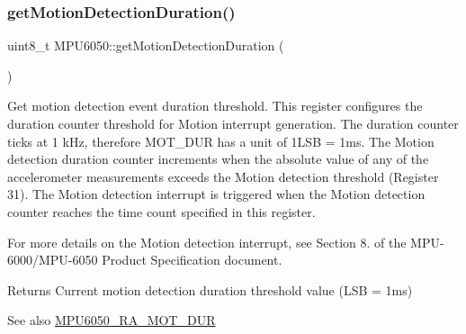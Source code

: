 \begin{DoxyCode}{0}

\end{DoxyCode}
\mbox{\label{classMPU6050_a8ba035c2ae4a05d7e51b0d29e4924fb0}} 
\subsubsection{\texorpdfstring{getMotionDetectionDuration()}{getMotionDetectionDuration()}}
{\footnotesize\ttfamily uint8\+\_\+t M\+P\+U6050\+::get\+Motion\+Detection\+Duration (\begin{DoxyParamCaption}{ }\end{DoxyParamCaption})}

Get motion detection event duration threshold. This register configures the duration counter threshold for Motion interrupt generation. The duration counter ticks at 1 k\+Hz, therefore M\+O\+T\+\_\+\+D\+UR has a unit of 1L\+SB = 1ms. The Motion detection duration counter increments when the absolute value of any of the accelerometer measurements exceeds the Motion detection threshold (Register 31). The Motion detection interrupt is triggered when the Motion detection counter reaches the time count specified in this register.

For more details on the Motion detection interrupt, see Section 8. of the M\+P\+U-\/6000/\+M\+P\+U-\/6050 Product Specification document.

\begin{DoxyReturn}{Returns}
Current motion detection duration threshold value (L\+SB = 1ms) 
\end{DoxyReturn}
\begin{DoxySeeAlso}{See also}
\mbox{\hyperlink{MPU6050_8h_a25ce9fe346237d22b62881257458fdf4}{M\+P\+U6050\+\_\+\+R\+A\+\_\+\+M\+O\+T\+\_\+\+D\+UR}} 
\end{DoxySeeAlso}



